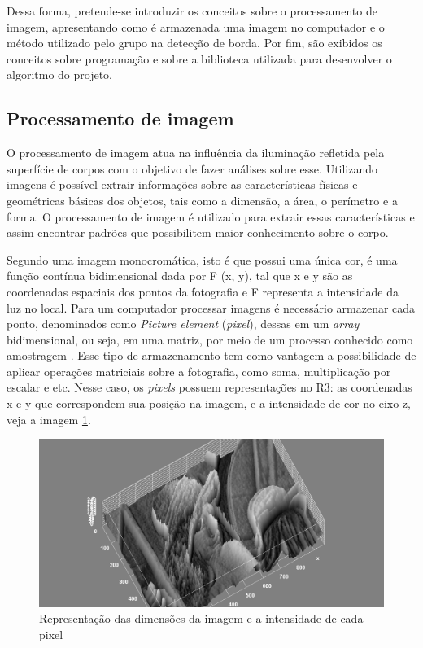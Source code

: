 \documentclass[12pt]{article}
\begin{document}
	Dessa forma, pretende-se introduzir os conceitos sobre o processamento de imagem, apresentando como é armazenada uma imagem no computador e o método utilizado pelo grupo na detecção de borda. Por fim, são exibidos os conceitos sobre programação e sobre a biblioteca utilizada para desenvolver o algoritmo do projeto.
	
	\subsection{Processamento de imagem}
	O processamento de imagem atua na influência da iluminação refletida pela superfície de corpos com o objetivo de fazer análises sobre esse. Utilizando imagens é possível extrair informações sobre as características físicas e geométricas básicas dos objetos, tais como a dimensão, a área, o perímetro e a forma. O processamento de imagem é utilizado para extrair essas características e assim encontrar padrões que possibilitem maior conhecimento sobre o corpo.
	
	Segundo \cite{de2006introduccao} uma imagem monocromática, isto é que possui uma única cor, é uma função contínua bidimensional dada por F (x, y), tal que x e y são as coordenadas espaciais dos pontos da fotografia e F representa a intensidade da luz no local. Para um computador processar imagens é necessário armazenar cada ponto, denominados como \textit{Picture element} (\textit{pixel}), dessas em um \textit{array} bidimensional, ou seja, em uma matriz, por meio de um processo conhecido como amostragem \citep{silva2000segmentaccao}. Esse tipo de armazenamento tem como vantagem a possibilidade de aplicar operações matriciais sobre a fotografia, como soma, multiplicação por escalar e etc. Nesse caso, os \textit{pixels} possuem representações no R3: as coordenadas x e y que correspondem sua posição na imagem, e a intensidade de cor no eixo z, veja a imagem \ref{fig:img1}.
	
	\begin{figure}[h!]
		\centering
		\includegraphics[width=0.7\linewidth]{img/img1}
		\caption{Representação das dimensões da imagem e a intensidade de cada pixel}
		\label{fig:img1}
	\end{figure}
	
\end{document}
